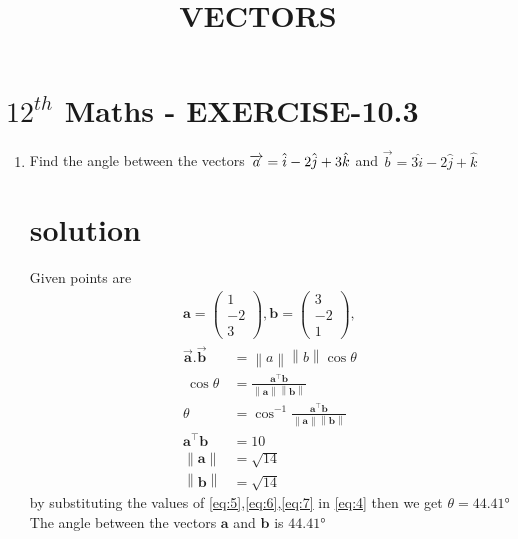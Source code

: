 \documentclass[journal,12pt]{article}
\newcommand{\myvec}[1]{\ensuremath{\begin{pmatrix}#1\end{pmatrix}}}
\providecommand{\norm}[1]{\left\lVert#1\right\rVert}
\let\vec\mathbf
\begin{document}
\begin{center}
\title{\textbf{VECTORS}}
\date{\vspace{-5ex}} %
\maketitle
\end{center}

\section*{$12^{th}$ Maths - EXERCISE-10.3}

\begin{enumerate}
\item Find the angle between the vectors $\\ \overrightarrow{a}=\hat{i}-2\hat{j}+3\hat{k}$ and $\overrightarrow{b}=3\hat{i}-2\hat{j}+\hat{k}$  
\section*{solution}
Given points are
\begin{align}
\vec{a} = \myvec{1\\-2\\3} , \vec{b} = \myvec{3\\ -2 \\ 1},
\end{align}
\begin{align}
\overrightarrow {\vec{a}}.\overrightarrow {\vec{b}}&=\norm{a}\norm{b}\cos\theta\\\
\cos\theta&=\frac{\vec{a}^{\top}\vec{b}}{\norm{\vec{a}}\norm{\vec{b}}}\\
\theta&=\cos^{-1}\frac{\vec{a}^{\top}\vec{b}}{\norm{\vec{a}}\norm{\vec{b}}}\label{eq:4}\\
\vec{a}^{\top}\vec{b}&=10 \label{eq:5} \\
\norm{\vec{a}}&=\sqrt{14} \label{eq:6}\\
\norm{\vec{b}}&=\sqrt{14}
\label{eq:7}
\end{align}
by substituting the values of \eqref{eq:5},\eqref{eq:6},\eqref{eq:7} in \eqref{eq:4} then  we get $\theta= \ang{44.41}$\\
 The angle between the vectors $\vec{a}$ and $\vec{b}$ is $\ang{44.41}$
\end{enumerate}
\end{document}
